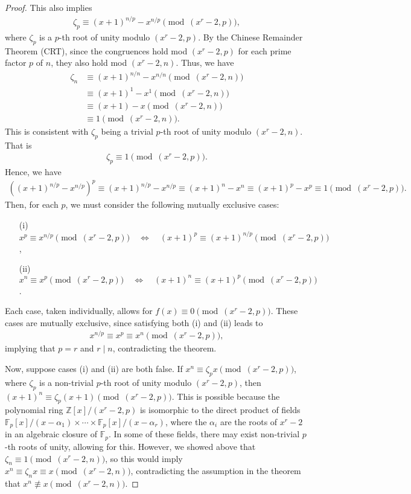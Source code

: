 \documentclass{article}
\theoremstyle{plain}
\theoremstyle{definition}
\newcommand{\Z}{\mathbb{Z}}
\begin{document}
\begin{proof}
This also implies
\begin{align*}
    \zeta_p \equiv (x+1)^{n/p} - x^{n/p} \pmod{(x^r-2, p)} ,
\end{align*}
where $\zeta_p$ is a $p$-th root of unity modulo $(x^r-2, p)$. By the Chinese Remainder Theorem (CRT), since the congruences hold mod $(x^r-2, p)$ for each prime factor $p$ of $n$, they also hold mod $(x^r-2, n)$. Thus, we have
\begin{align*}
\zeta_n &\equiv (x+1)^{n/n} - x^{n/n} \pmod{(x^r-2, n)} \\
&\equiv (x+1)^1 - x^1 \pmod{(x^r-2, n)} \\
&\equiv (x+1) - x \pmod{(x^r-2, n)} \\
&\equiv 1 \pmod{(x^r-2, n)} .
\end{align*}
This is consistent with $\zeta_p$ being a trivial $p$-th root of unity modulo $(x^r-2, n)$. That is
\begin{align*}
\zeta_p \equiv 1 \pmod{(x^r-2, p)} .
\end{align*}
Hence, we have
\begin{align*}
\left( (x+1)^{n/p} - x^{n/p} \right)^p \equiv (x+1)^{n/p} - x^{n/p} \equiv (x+1)^n - x^n \equiv (x+1)^p - x^p \equiv 1 \pmod{(x^r-2, p)} .
\end{align*}
Then, for each $p$, we must consider the following mutually exclusive cases:
\begin{enumerate}
\item[(i)] $x^p \equiv x^{n/p} \pmod{(x^r-2, p)} \quad\Longleftrightarrow\quad (x+1)^p \equiv (x+1)^{n/p} \pmod{(x^r-2, p)}$,
\item[(ii)] $x^n \equiv x^p \pmod{(x^r-2, p)} \quad\Longleftrightarrow\quad (x+1)^n \equiv (x+1)^p \pmod{(x^r-2, p)}$.
\end{enumerate}
Each case, taken individually, allows for $f(x) \equiv 0 \pmod{(x^r-2,p)}$. These cases are mutually exclusive, since satisfying both (i) and (ii) leads to
\begin{align*}
    x^{n/p} \equiv x^p \equiv x^n \pmod{(x^r-2, p)} ,
\end{align*}
implying that $p=r$ and $r \mid n$, contradicting the theorem.

Now, suppose cases (i) and (ii) are both false. If $x^n \equiv \zeta_p x \pmod{(x^r-2, p)}$, where $\zeta_p$ is a non-trivial $p$-th root of unity modulo $(x^r-2, p)$, then $(x+1)^n \equiv \zeta_p (x+1) \pmod{(x^r-2, p)}$. This is possible because the polynomial ring $\Z[x]/(x^r-2, p)$ is isomorphic to the direct product of fields $\mathbb{F}_p[x]/(x-\alpha_1) \times \cdots \times \mathbb{F}_p[x]/(x-\alpha_r)$, where the $\alpha_i$ are the roots of $x^r-2$ in an algebraic closure of $\mathbb{F}_p$. In some of these fields, there may exist non-trivial $p$-th roots of unity, allowing for this. However, we showed above that $\zeta_n \equiv 1 \pmod{(x^r-2, n)}$, so this would imply $x^n \equiv \zeta_n x \equiv x \pmod{(x^r-2, n)}$, contradicting the assumption in the theorem that $x^n \not\equiv x \pmod{(x^r-2, n)}$.


\end{proof}
\end{document}
